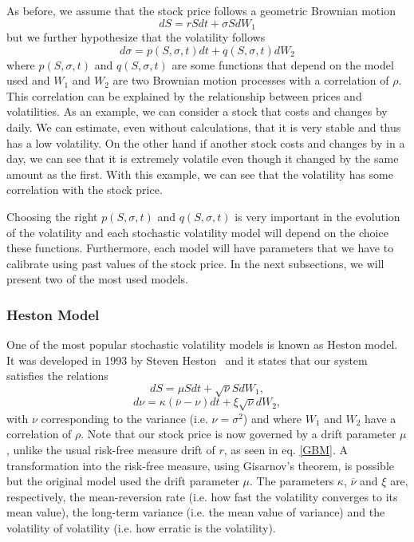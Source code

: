 As before, we assume that the stock price follows a geometric Brownian motion
\begin{equation}
dS=rSdt+\sigma SdW_1
\end{equation}
\noindent but we further hypothesize that the volatility follows
\begin{equation}
d\sigma=p(S,\sigma,t)dt+q(S,\sigma,t)dW_2
\end{equation}
\noindent where $p(S,\sigma,t)$ and $q(S,\sigma,t)$ are some functions that depend on the model used and $W_1$ and $W_2$ are two Brownian motion processes with a correlation of $\rho$. 
This correlation can be explained by the relationship between prices and volatilities. As an example, we can consider a stock that costs  and changes by  daily. We can estimate, even without calculations, that it is very stable and thus has a low volatility.
On the other hand if another stock costs  and changes by  in a day, we can see that it is extremely volatile even though it changed by the same amount as the first. With this example, we can see that the volatility has some correlation with the stock price.

Choosing the right $p(S,\sigma,t)$ and $q(S,\sigma,t)$ is very important in the evolution of the volatility and each stochastic volatility model will depend on the choice these functions. Furthermore, each model will have parameters that we have to calibrate using past values of the stock price. In the next subsections, we will present two of the most used models.



\subsubsection{Heston Model}
One of the most popular stochastic volatility models is known as Heston model. It was developed in 1993 by Steven Heston~\cite{Heston} and it states that our system satisfies the relations
\begin{equation}
dS=\mu Sdt+\sqrt{\nu}SdW_1,
\end{equation}
\begin{equation}
d\nu=\kappa(\overline{\nu}-\nu)dt+\xi\sqrt{\nu}dW_2,
\end{equation}
\noindent with $\nu$ corresponding to the variance (i.e. $\nu=\sigma^2$) and where $W_1$ and $W_2$ have a correlation of $\rho$. Note that our stock price is now governed by a drift parameter $\mu$, unlike the usual risk-free measure drift of $r$, as seen in eq. \eqref{GBM}. A transformation into the risk-free measure, using Gisarnov's theorem, is possible but the original model used the drift parameter $\mu$.
The parameters $\kappa$, $\overline{\nu}$ and $\xi$ are, respectively, the mean-reversion rate (i.e. how fast the volatility converges to its mean value), the long-term variance (i.e. the mean value of variance) and the volatility of volatility (i.e. how erratic is the volatility).

